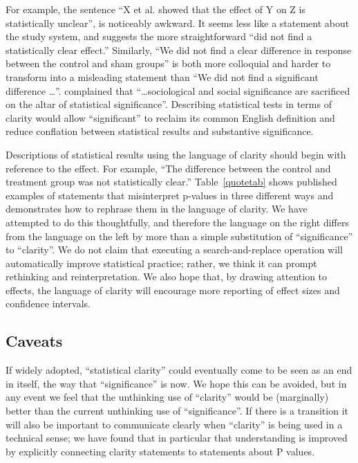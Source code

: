 \documentclass[12pt, english, dvipsnames, table]{article} %
\newcommand{\pvals}{p-values\xspace}
\begin{document}
For example, the sentence ``X et al. showed that the effect of Y on Z is statistically unclear'', is noticeably awkward. It seems less like a statement about the study system, and suggests the more straightforward ``did not find a statistically clear effect.'' Similarly, ``We did not find a clear difference in response between the control and sham groups'' is both more colloquial and harder to transform into a misleading statement than ``We did not find a significant difference \ldots''. \citet{Bernardietal.2017} complained that ``\ldots sociological and social significance are sacrificed on the altar of statistical significance''. Describing statistical tests in terms of clarity would allow ``significant'' to reclaim its common English definition and reduce conflation between statistical results and substantive significance.

Descriptions of statistical results using the language of clarity should begin with reference to the effect. For example, ``The difference between the control and treatment group was not statistically clear.'' Table~\ref{quotetab} shows published examples of statements that misinterpret \pvals in three different ways and demonstrates how to rephrase them in the language of clarity. We have attempted to do this thoughtfully, and therefore the language on the right differs from the language on the left by more than a simple substitution of ``significance'' to ``clarity''. We do not claim that executing a search-and-replace operation will automatically improve statistical practice; rather, we think it can prompt rethinking and reinterpretation. We also hope that, by drawing attention to effects, the language of clarity will encourage more reporting of effect sizes and confidence intervals.

\subsection*{Caveats}

If widely adopted, ``statistical clarity'' could eventually come to be seen as an end in itself, the way that ``significance'' is now. We hope this can be avoided, but in any event we feel that the unthinking use of ``clarity'' would be (marginally) better than the current unthinking use of ``significance''. If there is a transition it will also be important to communicate clearly when ``clarity'' is being used in a technical sense; we have found that in particular that understanding is improved by explicitly connecting clarity statements to statements about P values.
\end{document}
